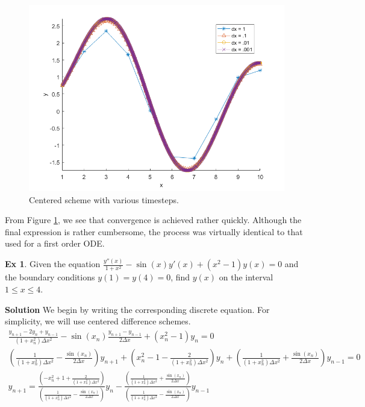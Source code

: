 \documentclass[]{article}
\theoremstyle{definition}
\newtheorem{exmp}{Ex}[section]
\numberwithin{equation}{section}
\begin{document}
	\begin{center}
	\begin{figure}[H]
		\includegraphics[scale=.75]{2_2fig.png} 
		\caption{Centered scheme with various timesteps.}
		\label{fig:num_bessel_fig}
	\end{figure}
	\end{center}
	From Figure \ref{fig:num_bessel_fig}, we see that convergence is achieved rather quickly. Although the final expression is rather cumbersome, the process was virtually identical to that used for a first order ODE.
	\begin{exmp}
		Given the equation $\frac{y''(x)}{1+x^2} - \sin(x)y'(x) + (x^2 - 1)y(x) = 0$ and the boundary conditions $y(1) = y(4) = 0$, find $y(x)$ on the interval $ 1 \leq x \leq 4$. 
	\end{exmp}
	\textbf{Solution} We begin by writing the corresponding discrete equation. For simplicity, we will use centered difference schemes.
	\begin{gather*}
		\frac{y_{n+1} - 2y_n + y_{n-1}}{(1+x_n^2)\Delta x^2} - \sin(x_n) \frac{y_{n+1} - y_{n-1}}{2\Delta x} + (x_n^2 -1) y_n = 0 \\
		\left(\frac{1}{(1+x_n^2)\Delta x^2} - \frac{\sin(x_n)}{2\Delta x}\right) y_{n+1} + \left(x^2_n -1 - \frac{2}{(1+x_n^2)\Delta x^2}\right) y_n + \left(\frac{1}{(1+x_n^2)\Delta x^2} + \frac{\sin(x_n)}{2\Delta x}\right) y_{n-1} = 0 \\
		y_{n+1} = \frac{\left(-x^2_n +1 + \frac{2}{(1+x_n^2)\Delta x^2}\right)}{\left(\frac{1}{(1+x_n^2)\Delta x^2} - \frac{\sin(x_n)}{2\Delta x}\right)} y_{n} - \frac{\left(\frac{1}{(1+x_n^2)\Delta x^2} + \frac{\sin(x_n)}{2\Delta x}\right)}{\left(\frac{1}{(1+x_n^2)\Delta x^2} - \frac{\sin(x_n)}{2\Delta x}\right) } y_{n-1}
	\end{gather*}
\end{document}
